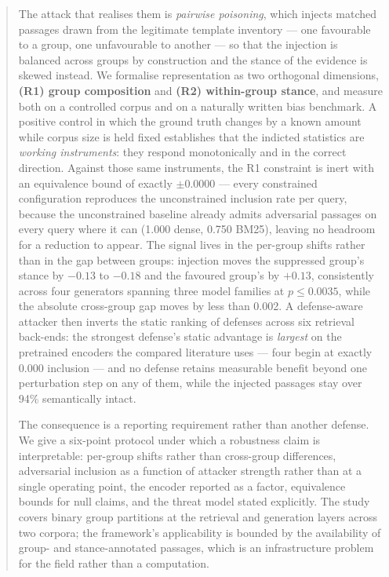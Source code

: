 \documentclass[authoryear,review,3p,times]{elsarticle}
\begin{document}
\begin{abstract}
The attack that realises them is \emph{pairwise poisoning}, which injects matched passages drawn from the legitimate template inventory --- one favourable to a group, one unfavourable to another --- so that the injection is balanced across groups by construction and the stance of the evidence is skewed instead. We formalise representation as two orthogonal dimensions, \textbf{(R1) group composition} and \textbf{(R2) within-group stance}, and measure both on a controlled corpus and on a naturally written bias benchmark. A positive control in which the ground truth changes by a known amount while corpus size is held fixed establishes that the indicted statistics are \emph{working instruments}: they respond monotonically and in the correct direction. Against those same instruments, the R1 constraint is inert with an equivalence bound of exactly \(\pm 0.0000\) --- every constrained configuration reproduces the unconstrained inclusion rate per query, because the unconstrained baseline already admits adversarial passages on every query where it can (1.000 dense, 0.750 BM25), leaving no headroom for a reduction to appear. The signal lives in the per-group shifts rather than in the gap between groups: injection moves the suppressed group's stance by \(-0.13\) to \(-0.18\) and the favoured group's by \(+0.13\), consistently across four generators spanning three model families at \(p \le 0.0035\), while the absolute cross-group gap moves by less than 0.002. A defense-aware attacker then inverts the static ranking of defenses across six retrieval back-ends: the strongest defense's static advantage is \emph{largest} on the pretrained encoders the compared literature uses --- four begin at exactly 0.000 inclusion --- and no defense retains measurable benefit beyond one perturbation step on any of them, while the injected passages stay over 94\% semantically intact.

The consequence is a reporting requirement rather than another defense. We give a six-point protocol under which a robustness claim is interpretable: per-group shifts rather than cross-group differences, adversarial inclusion as a function of attacker strength rather than at a single operating point, the encoder reported as a factor, equivalence bounds for null claims, and the threat model stated explicitly. The study covers binary group partitions at the retrieval and generation layers across two corpora; the framework's applicability is bounded by the availability of group- and stance-annotated passages, which is an infrastructure problem for the field rather than a computation.

\end{abstract}
\end{document}
